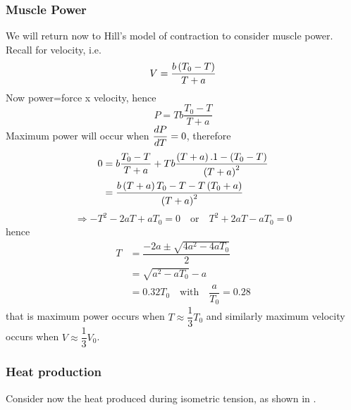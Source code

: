 \subsubsection{Muscle Power}
We will return now to Hill's model of contraction to consider muscle power.
Recall  for velocity, i.e.
\begin{equation*}
  V=\dfrac{b\left( T_{0}-T \right)}{T+a}
\end{equation*}
Now power=force x velocity, hence
\begin{equation}
  P=Tb\dfrac{T_{0}-T}{T+a}
\end{equation}
Maximum power will occur when $ \dfrac{ d P}{d T} =0$, therefore
\begin{equation*}
  \begin{split}
    0 &= b\dfrac{T_{0}-T}{T+a}+Tb\dfrac{\left( T+a \right).1-\left( T_{0}-T \right)}
    {\left( T+a \right)^{2}} \\
    &= \dfrac{b\left( T+a \right){T_{0}-T}-T\left( T_{0}+a \right)}{\left( T+a \right)^{2}}
  \end{split}
\end{equation*}
\begin{equation*}
  \Rightarrow -T^{2}-2aT+aT_{0}=0 \quad \text{or} \quad T^{2}+2aT-aT_{0}=0
\end{equation*}
hence
\begin{equation*}
  \begin{split}
    T &= \dfrac{-2a \pm \sqrt{4a^{2}-4aT_{0}}}{2} \\
    &= \sqrt{a^{2}-aT_{0}}-a \\
    &= 0.32T_{0} \quad \text{with}\quad \dfrac{a}{T_{0}}=0.28
  \end{split}
\end{equation*}
that is maximum power occurs when $T \approx \dfrac{1}{3}T_{0}$ and similarly
maximum velocity occurs when $V \approx \dfrac{1}{3}V_{0}$.

\subsubsection{Heat production}

Consider now the heat produced during isometric tension, as shown in
.


